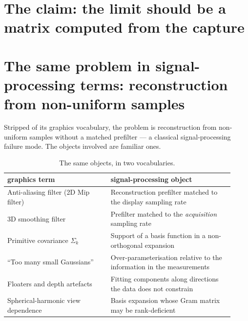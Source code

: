 \section{The claim: the limit should be a matrix computed from the capture}


\section{The same problem in signal-processing terms: reconstruction from non-uniform samples}

Stripped of its graphics vocabulary, the problem is reconstruction from
non-uniform samples without a matched prefilter --- a classical
signal-processing failure mode. The objects involved are familiar ones.

\begin{table}[htbp]
  \centering
  \caption{The same objects, in two vocabularies.}
  \small
  \begin{tabular}{p{0.42\linewidth}p{0.5\linewidth}}
    \toprule
    graphics term & signal-processing object \\
    \midrule
    Anti-aliasing filter (2D Mip filter) & Reconstruction prefilter matched to the display sampling rate \\
    3D smoothing filter & Prefilter matched to the \emph{acquisition} sampling rate \\
    Primitive covariance $\Sigma_k$ & Support of a basis function in a non-orthogonal expansion \\
    ``Too many small Gaussians'' & Over-parameterisation relative to the information in the measurements \\
    Floaters and depth artefacts & Fitting components along directions the data does not constrain \\
    Spherical-harmonic view dependence & Basis expansion whose Gram matrix may be rank-deficient \\
    \bottomrule
  \end{tabular}
\end{table}

